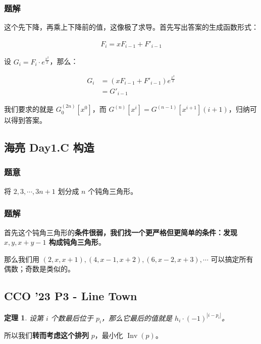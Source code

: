 \documentclass[12pt, a4paper, oneside]{ctexart}
\newtheorem{theorem}{定理}[subsection]
\begin{document}
\subsubsection{题解}

这个先下降，再乘上下降前的值，这像极了求导。首先写出答案的生成函数形式：

\begin{align*}
    F_i=xF_{i-1}+F'_{i-1}
\end{align*}

设 $G_i=F_i\cdot e^{\frac{x^2}2}$，那么：

\begin{align*}
    G_i&=\left(xF_{i-1}+F'_{i-1}\right)e^{\frac{x^2}2}\\
    &=G'_{i-1}
\end{align*}

我们要求的就是 $G_0^{(2n)}[x^0]$，而 $G^{(n)}[x^i]=G^{(n-1)}[x^{i+1}](i+1)$，归纳可以得到答案。

\subsection{海亮 Day1.C 构造}

\subsubsection{题意}

将 $2,3,\cdots,3n+1$ 划分成 $n$ 个钝角三角形。

\subsubsection{题解}

首先这个钝角三角形的\textbf{条件很弱，我们找一个更严格但更简单的条件：发现 $x,y,x+y-1$ 构成钝角三角形}。

那么我们用 $(2,x,x+1),(4,x-1,x+2),(6,x-2,x+3),\cdots$ 可以搞定所有偶数；奇数是类似的。

\subsection{CCO '23 P3 - Line Town}

\begin{theorem}
    设第 $i$ 个数最后位于 $p_i$，那么它最后的值就是 $h_i\cdot (-1)^{|i-p_i|}$。
\end{theorem}

所以我们\textbf{转而考虑这个排列} $p$，最小化 $\operatorname{Inv}(p)$。
\end{document}
